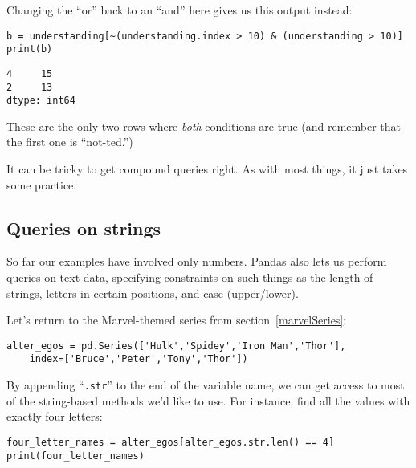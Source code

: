 Changing the ``or'' back to an ``and'' here gives us this output instead:

\begin{Verbatim}[fontsize=\scriptsize,samepage=true,frame=single,framesep=3mm]
b = understanding[~(understanding.index > 10) & (understanding > 10)]
print(b)
\end{Verbatim}

\begin{Verbatim}[fontsize=\small,samepage=true,frame=leftline,framesep=5mm,framerule=1mm]
4     15
2     13
dtype: int64
\end{Verbatim}

These are the only two rows where \textit{both} conditions are true (and
remember that the first one is ``not-ted.'')

It can be tricky to get compound queries right. As with most things, it just
takes some practice.

\subsection{Queries on strings}

So far our examples have involved only numbers. Pandas also lets us perform
queries on text data, specifying constraints on such things as the length of
strings, letters in certain positions, and case (upper/lower).


Let's return to the Marvel-themed series from section~\ref{marvelSeries}:

\begin{Verbatim}[fontsize=\footnotesize,samepage=true,frame=single,framesep=3mm]
alter_egos = pd.Series(['Hulk','Spidey','Iron Man','Thor'],
    index=['Bruce','Peter','Tony','Thor'])
\end{Verbatim}


By appending ``\texttt{.str}'' to the end of the variable name, we can get
access to most of the string-based methods we'd like to use. For instance, find
all the values with exactly four letters:

\begin{Verbatim}[fontsize=\small,samepage=true,frame=single,framesep=3mm]
four_letter_names = alter_egos[alter_egos.str.len() == 4]
print(four_letter_names)
\end{Verbatim}
\vspace{-.3in}

